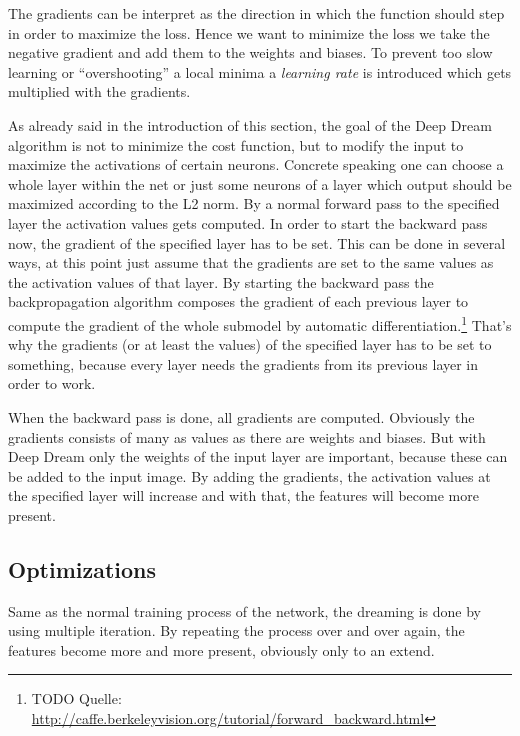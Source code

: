 The gradients can be interpret as the direction in which the function should step in order to maximize the loss.
Hence we want to minimize the loss we take the negative gradient and add them to the weights and biases.
To prevent too slow learning or \enquote{overshooting} a local minima a \emph{learning rate} is introduced which gets multiplied with the gradients.

As already said in the introduction of this section, the goal of the Deep Dream algorithm is not to minimize the cost function, but to modify the input to maximize the activations of certain neurons.
Concrete speaking one can choose a whole layer within the net or just some neurons of a layer which output should be maximized according to the L2 norm.
By a normal forward pass to the specified layer the activation values gets computed.
In order to start the backward pass now, the gradient of the specified layer has to be set.
This can be done in several ways, at this point just assume that the gradients are set to the same values as the
activation values of that layer.
By starting the backward pass the backpropagation algorithm composes the gradient of each previous layer to compute the gradient of the whole submodel by automatic differentiation.\footnote{TODO Quelle: \url{http://caffe.berkeleyvision.org/tutorial/forward_backward.html}}
That's why the gradients (or at least the values) of the specified layer has to be set to something, because every layer needs the gradients from its previous layer in order to work.


When the backward pass is done, all gradients are computed.
Obviously the gradients consists of many as values as there are weights and biases.
But with Deep Dream only the weights of the input layer are important, because these can be added to the input image.
By adding the gradients, the activation values at the specified layer will increase and with that, the features will become more present.

\subsection{Optimizations}
\label{sec:optimizations}
Same as the normal training process of the network, the dreaming is done by using multiple iteration.
By repeating the process over and over again, the features become more and more present, obviously only to an extend.


